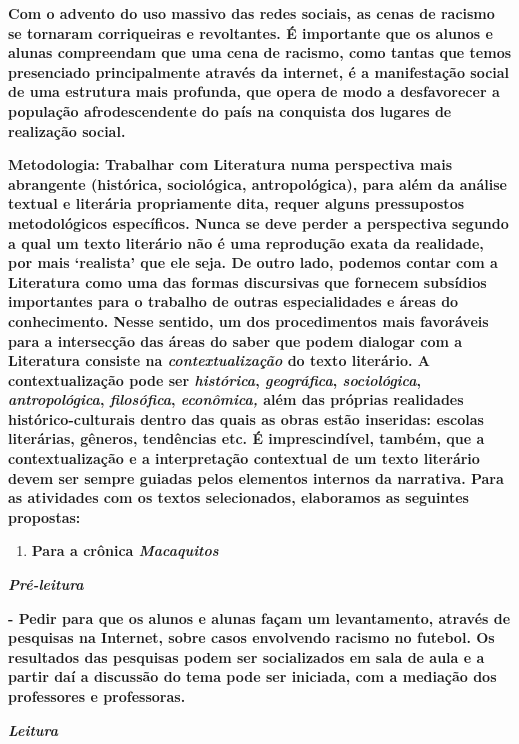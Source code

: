 \textbf{Com o advento do uso massivo das redes sociais, as cenas de
racismo se tornaram corriqueiras e revoltantes. É importante que os
alunos e alunas compreendam que uma cena de racismo, como tantas que
temos presenciado principalmente através da internet, é a manifestação
social de uma estrutura mais profunda, que opera de modo a desfavorecer
a população afrodescendente do país na conquista dos lugares de
realização social. }

\textbf{Metodologia: Trabalhar com Literatura numa perspectiva mais
abrangente (histórica, sociológica, antropológica), para além da análise
textual e literária propriamente dita, requer alguns pressupostos
metodológicos específicos. Nunca se deve perder a perspectiva segundo a
qual um texto literário não é uma reprodução exata da realidade, por
mais `realista' que ele seja. De outro lado, podemos contar com a
Literatura como uma das formas discursivas que fornecem subsídios
importantes para o trabalho de outras especialidades e áreas do
conhecimento. Nesse sentido, um dos procedimentos mais favoráveis para a
intersecção das áreas do saber que podem dialogar com a Literatura
consiste na \emph{contextualização} do texto literário. A
contextualização pode ser \emph{histórica}, \emph{geográfica},
\emph{sociológica}, \emph{antropológica}, \emph{filosófica},
\emph{econômica,} além das próprias realidades histórico-culturais
dentro das quais as obras estão inseridas: escolas literárias, gêneros,
tendências etc. É imprescindível, também, que a contextualização e a
interpretação contextual de um texto literário devem ser sempre guiadas
pelos elementos internos da narrativa. Para as atividades com os textos
selecionados, elaboramos as seguintes propostas:}

\begin{enumerate}
\def\labelenumi{\arabic{enumi})}
\item
  \textbf{Para a crônica \emph{Macaquitos }}
\end{enumerate}

\emph{\textbf{Pré-leitura }}

\textbf{- Pedir para que os alunos e alunas façam um levantamento,
através de pesquisas na Internet, sobre casos envolvendo racismo no
futebol. Os resultados das pesquisas podem ser socializados em sala de
aula e a partir daí a discussão do tema pode ser iniciada, com a
mediação dos professores e professoras.}

\emph{\textbf{Leitura}}

